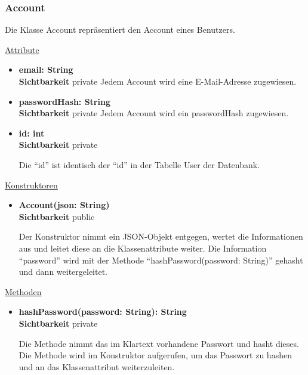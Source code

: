 \subsubsection{Account} \label{service:klasse:Account}
Die Klasse Account repräsentiert den Account eines Benutzers. \newline

\underline{Attribute}
\begin{itemize}
\itemsep0pt
\item \textbf{email: String} \hfill\\ 
\textbf{Sichtbarkeit} private 
Jedem Account wird eine E-Mail-Adresse zugewiesen.

\item \textbf{passwordHash: String} \hfill\\ 
\textbf{Sichtbarkeit} private 
Jedem Account wird ein passwordHash zugewiesen.

\item \textbf{id: int} \hfill\\ 
\textbf{Sichtbarkeit} private  

Die ``id'' ist identisch der ``id'' in der Tabelle User der Datenbank.

\end{itemize}

\underline{Konstruktoren}
\begin{itemize}
\itemsep0pt
\item \textbf{Account(json: String)} \hfill\\
\textbf{Sichtbarkeit} public

Der Konstruktor nimmt ein JSON-Objekt entgegen, wertet die Informationen aus und leitet diese an die Klassenattribute weiter. Die Information ``password'' wird mit der Methode ``hashPassword(password: String)'' gehasht und dann weitergeleitet.

\end{itemize}

\underline{Methoden}
\begin{itemize}
\itemsep0pt
\item \textbf{hashPassword(password: String): String}\hfill\\
\textbf{Sichtbarkeit} private

Die Methode nimmt das im Klartext vorhandene Passwort und hasht dieses. Die Methode wird im Konstruktor aufgerufen, um das Passwort zu hashen und an das Klassenattribut weiterzuleiten.

\end{itemize}